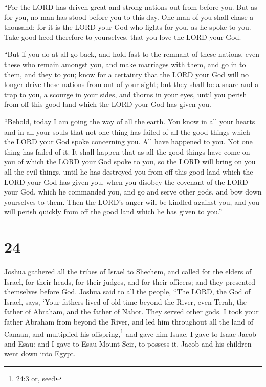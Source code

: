  ``For the LORD has driven great and strong nations out from
before you. But as for you, no man has stood before you to this day.
 One man of you shall chase a thousand; for it is the LORD
your God who fights for you, as he spoke to you.  Take good
heed therefore to yourselves, that you love the LORD your God.

 ``But if you do at all go back, and hold fast to the
remnant of these nations, even these who remain amongst you, and make
marriages with them, and go in to them, and they to you; 
know for a certainty that the LORD your God will no longer drive these
nations from out of your sight; but they shall be a snare and a trap to
you, a scourge in your sides, and thorns in your eyes, until you perish
from off this good land which the LORD your God has given you.

 ``Behold, today I am going the way of all the earth. You
know in all your hearts and in all your souls that not one thing has
failed of all the good things which the LORD your God spoke concerning
you. All have happened to you. Not one thing has failed of it.
 It shall happen that as all the good things have come on
you of which the LORD your God spoke to you, so the LORD will bring on
you all the evil things, until he has destroyed you from off this good
land which the LORD your God has given you,  when you
disobey the covenant of the LORD your God, which he commanded you, and
go and serve other gods, and bow down yourselves to them. Then the
LORD's anger will be kindled against you, and you will perish quickly
from off the good land which he has given to you.''

\hypertarget{section-23}{%
\section{24}\label{section-23}}

 Joshua gathered all the tribes of Israel to Shechem, and
called for the elders of Israel, for their heads, for their judges, and
for their officers; and they presented themselves before God.
 Joshua said to all the people, ``The LORD, the God of
Israel, says, `Your fathers lived of old time beyond the River, even
Terah, the father of Abraham, and the father of Nahor. They served other
gods.  I took your father Abraham from beyond the River, and
led him throughout all the land of Canaan, and multiplied his
offspring,\footnote{24:3 or, seed} and gave him Isaac.  I
gave to Isaac Jacob and Esau: and I gave to Esau Mount Seir, to possess
it. Jacob and his children went down into Egypt.

